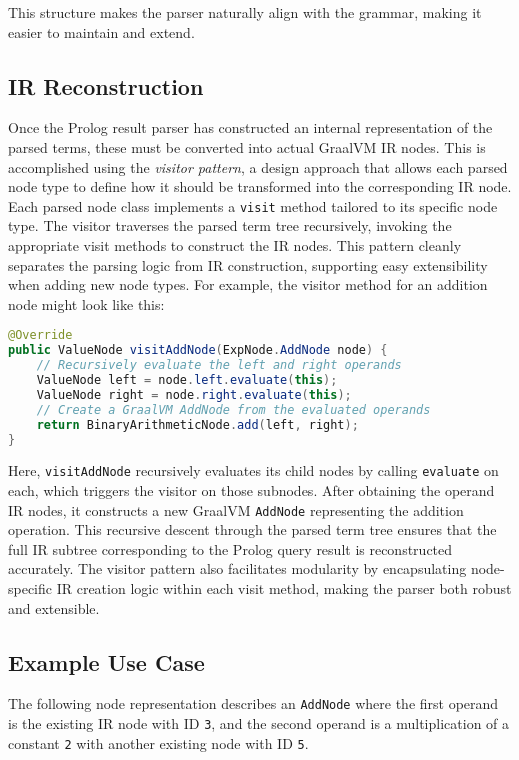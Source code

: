 This structure makes the parser naturally align with the grammar, making it easier to maintain and extend.

\subsection{IR Reconstruction}

Once the Prolog result parser has constructed an internal representation of the parsed terms, these must be converted into actual GraalVM IR nodes. This is accomplished using the \emph{visitor pattern}, a design approach that allows each parsed node type to define how it should be transformed into the corresponding IR node.
Each parsed node class implements a \texttt{visit} method tailored to its specific node type. The visitor traverses the parsed term tree recursively, invoking the appropriate visit methods to construct the IR nodes. This pattern cleanly separates the parsing logic from IR construction, supporting easy extensibility when adding new node types.
For example, the visitor method for an addition node might look like this:
\smallbreak
\begin{lstlisting}[language=Java]
@Override
public ValueNode visitAddNode(ExpNode.AddNode node) {
    // Recursively evaluate the left and right operands
    ValueNode left = node.left.evaluate(this);
    ValueNode right = node.right.evaluate(this);
    // Create a GraalVM AddNode from the evaluated operands
    return BinaryArithmeticNode.add(left, right);
}
\end{lstlisting}

Here, \texttt{visitAddNode} recursively evaluates its child nodes by calling \texttt{evaluate} on each, which triggers the visitor on those subnodes. After obtaining the operand IR nodes, it constructs a new GraalVM \texttt{AddNode} representing the addition operation.
This recursive descent through the parsed term tree ensures that the full IR subtree corresponding to the Prolog query result is reconstructed accurately. The visitor pattern also facilitates modularity by encapsulating node-specific IR creation logic within each visit method, making the parser both robust and extensible.

\subsection{Example Use Case}
The following node representation describes an \texttt{AddNode} where the first operand is the existing IR node with ID \texttt{3}, and the second operand is a multiplication of a constant \texttt{2} with another existing node with ID \texttt{5}.

